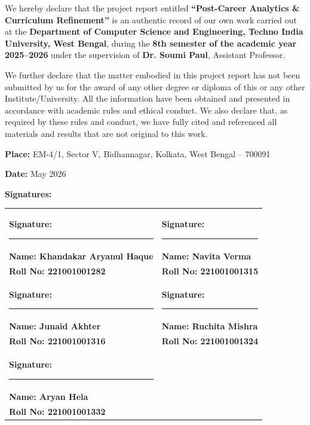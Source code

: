 \documentclass[oneside]{ecsproject}     %
\begin{document}
\begin{declaration}
We hereby declare that the project report entitled \textbf{``Post-Career Analytics \& Curriculum Refinement''} is an authentic record of our own work carried out at the \textbf{Department of Computer Science and Engineering, Techno India University, West Bengal}, during the \textbf{8th semester of the academic year 2025--2026} under the supervision of \textbf{Dr. Soumi Paul}, Assistant Professor.

We further declare that the matter embodied in this project report has not been submitted by us for the award of any other degree or diploma of this or any other Institute/University. All the information have been
obtained and presented in accordance with academic rules and ethical conduct.
We also declare that, as required by these rules and conduct, we have fully cited and referenced all materials and results that are not original to this work.

\vspace{1.2em}

\noindent
\textbf{Place:} EM-4/1, Sector V, Bidhannagar, Kolkata, West Bengal -- 700091
\par\vspace{0.1cm}
\textbf{Date:} May 2026

\vspace{0.7em}

\noindent
\textbf{Signatures:}

\vspace{0.1em}

\noindent
\begin{center}
\begin{tabular}{p{} p{}}
\textbf{Signature:} \rule{4.5cm}{0.4pt} &
\textbf{Signature:} \rule{4.5cm}{0.4pt} \\[-0.2em]
\textbf{Name: Khandakar Aryanul Haque} &
\textbf{Name: Navita Verma} \\[-0.2em]
\textbf{Roll No: 221001001282} &
\textbf{Roll No: 221001001315} \\[1.2em]

\textbf{Signature:} \rule{4.5cm}{0.4pt} &
\textbf{Signature:} \rule{4.5cm}{0.4pt} \\[-0.2em]
\textbf{Name: Junaid Akhter} &
\textbf{Name: Ruchita Mishra} \\[-0.2em]
\textbf{Roll No: 221001001316} &
\textbf{Roll No: 221001001324} \\[1.2em]

\textbf{Signature:} \rule{4.5cm}{0.4pt} \\
\textbf{Name: Aryan Hela} \\[-0.2em]
\textbf{Roll No: 221001001332}
\end{tabular}
\end{center}

\vspace{0.5em}

\end{declaration}
\end{document}
